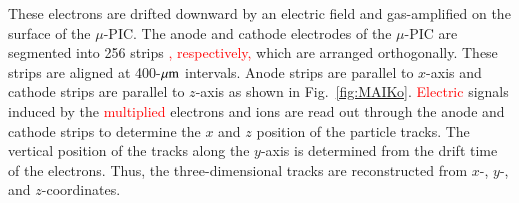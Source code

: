 \documentclass{jps-cp}
\begin{document}
These electrons are drifted downward by an electric field and
gas-amplified on the surface of the $\mu$-PIC.
%
The anode and cathode electrodes of the $\mu$-PIC are segmented into 256 strips 
\textcolor{red}{, respectively,} which are arranged orthogonally.
These strips are aligned at 400-$\rm{\mu m}$ intervals.
Anode strips are parallel to $x$-axis and %
cathode strips are parallel to $z$-axis as shown in Fig.~\ref{fig:MAIKo}. %
\textcolor{red}{Electric} signals induced by the \textcolor{red}{multiplied} electrons
and ions are read out through the anode and 
cathode strips to determine the $x$ and $z$ position of the particle tracks.
The vertical position of the tracks along the $y$-axis is determined 
from the drift time of the electrons.
Thus, the three-dimensional tracks are reconstructed from $x$-, $y$-, and $z$-coordinates.
\end{document}
